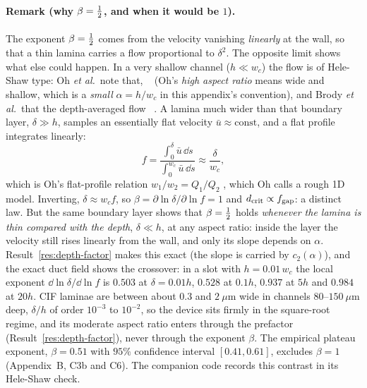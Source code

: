 \paragraph{Remark (why $\beta=\tfrac{1}{2}$, and when it would be $1$).} The exponent $\beta=\tfrac{1}{2}$
comes from the velocity vanishing \emph{linearly} at the wall, so that a thin lamina carries a
flow proportional to $\delta^2$. The opposite limit shows what else could happen. In a very
shallow channel ($h\ll w_c$) the flow is of Hele-Shaw type: Oh \emph{et al.}\ note that,
~\cite[p.~525]{b13}
(Oh's \emph{high aspect ratio} means wide and shallow, which is a \emph{small} $\alpha=h/w_c$ in
this appendix's convention),
and Brody \emph{et al.}\ that the depth-averaged flow ~\cite[p.~3433]{bbrody}.
A lamina much wider than that boundary layer, $\delta\gg h$, samples an essentially flat
velocity $\bar u\approx\text{const}$, and a flat profile integrates linearly:
\begin{equation}
f = \frac{\int_0^{\delta}\bar u\,\dd s}{\int_0^{w_c}\bar u\,\dd s} \approx \frac{\delta}{w_c},
\end{equation}
which is Oh's flat-profile relation $w_1/w_2=Q_1/Q_2$ \cite[p.~525, eqn~22]{b13}, which Oh
calls a rough 1D model. Inverting, $\delta\approx w_c f$, so
$\beta=\partial\ln\delta/\partial\ln f=1$ and $d_{\mathrm{crit}}\propto f_{\mathrm{gap}}$: a distinct law. But the
same boundary layer shows that $\beta=\tfrac{1}{2}$ holds \emph{whenever the lamina is thin compared
with the depth}, $\delta\ll h$, at any aspect ratio: inside the layer the velocity still rises
linearly from the wall, and only its slope depends on $\alpha$. Result~\ref{res:depth-factor}
makes this exact (the slope is carried by $c_2(\alpha)$), and the exact duct field shows the
crossover: in a slot with $h=0.01\,w_c$ the local exponent
$\dd\ln\delta/\dd\ln f$ is $0.503$ at $\delta=0.01h$, $0.528$ at $0.1h$, $0.937$ at $5h$ and
$0.984$ at $20h$. CIF laminae are between about $0.3$ and $2~\mu$m wide in channels
$80$--$150~\mu$m deep, $\delta/h$ of order $10^{-3}$ to $10^{-2}$, so the device sits firmly in
the square-root regime, and its moderate aspect ratio enters through the prefactor
(Result~\ref{res:depth-factor}), never through the exponent $\beta$. The empirical plateau exponent,
$\beta=0.51$ with $95\%$ confidence interval $[0.41,0.61]$, excludes $\beta=1$ (Appendix~B,
C3b and C6). The companion code records this contrast in its Hele-Shaw check.

